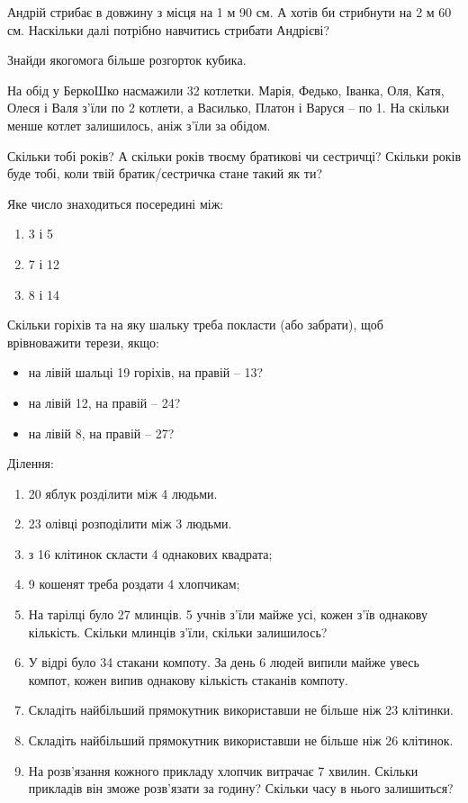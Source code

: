 \problem
Андрій стрибає в довжину з місця на 1 м 90 см.
А хотів би стрибнути на 2 м 60 см.
Наскільки далі потрібно навчитись стрибати Андрієві?


\problem
Знайди якогомога більше розгорток кубика.


\problem
На обід у БеркоШко насмажили 32 котлетки.
Марія, Федько, Іванка, Оля, Катя, Олеся і Валя з’їли по 2 котлети,
а Василько, Платон і Варуся – по 1.
На скільки менше котлет залишилось, аніж з’їли за обідом.


\problem
Скільки тобі років?
А скільки років твоєму братикові чи сестричці?
Скільки років буде тобі, коли твій братик/сестричка стане такий як ти?


\problem
Яке число знаходиться посередині між:
\begin{multicols}{3}
    \begin{enumerate}
        \item 3 і 5
        \item 7 і  12
        \item 8 і 14
    \end{enumerate}
\end{multicols}


\problem
Скільки горіхів та на яку шальку треба покласти (або забрати),
щоб врівноважити терези, якщо:
\begin{itemize}
    \item на лівій шальці 19 горіхів, на правій – 13?
    \item на лівій 12, на правій – 24?
    \item на лівій 8, на правій – 27?
\end{itemize}


\problem
Ділення:
\begin{enumerate}
    \item 20 яблук розділити між 4 людьми.
    \item 23 олівці розподілити між 3 людьми.
    \item з 16 клітинок скласти 4 однакових квадрата;
    \item 9 кошенят треба роздати 4 хлопчикам;
    \item На тарілці було 27 млинців. 5 учнів з'їли майже усі,
    кожен з'їв однакову кількість.
    Скільки млинців з'їли, скільки залишилось?
    \item У відрі було 34 стакани компоту.
    За день 6 людей випили майже увесь компот,
    кожен випив однакову кількість стаканів компоту.
    \item Складіть найбільший прямокутник використавши
    не більше ніж 23 клітинки.
    \item Складіть найбільший прямокутник використавши
    не більше ніж 26 клітинок.
    \item На розв'язання кожного прикладу хлопчик витрачає 7 хвилин.
    Скільки прикладів він зможе розв'язати за годину?
    Скільки часу в нього залишиться?
\end{enumerate}


